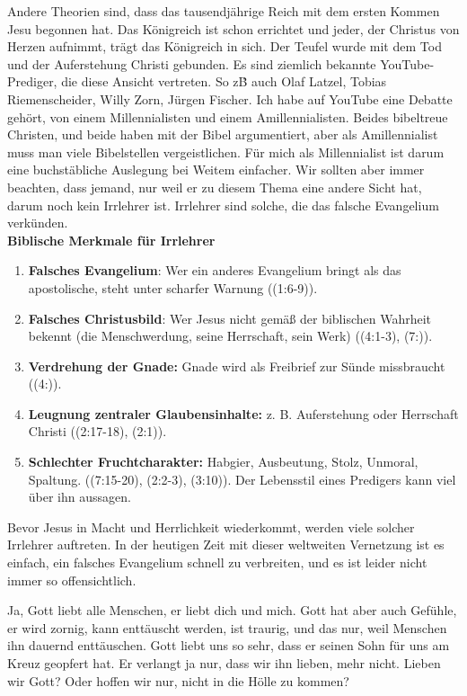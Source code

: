 \begin{otsblock}
        Andere Theorien sind, dass das tausendjährige Reich mit dem ersten Kommen Jesu begonnen hat. Das Königreich ist schon errichtet und jeder, der Christus von Herzen aufnimmt, trägt das Königreich in sich. Der Teufel wurde mit dem Tod und der Auferstehung Christi gebunden. Es sind ziemlich bekannte YouTube-Prediger, die diese Ansicht vertreten. So z\.B auch Olaf Latzel, Tobias Riemenscheider, Willy Zorn, Jürgen Fischer.
        Ich habe auf YouTube eine Debatte gehört, von einem Millennialisten und einem Amillennialisten. Beides bibeltreue Christen, und beide haben mit der Bibel argumentiert, aber als Amillennialist muss man viele Bibelstellen vergeistlichen. Für mich als Millennialist ist darum eine buchstäbliche Auslegung bei Weitem einfacher. Wir sollten aber immer beachten, dass jemand, nur weil er zu diesem Thema eine andere Sicht hat, darum noch kein Irrlehrer ist. Irrlehrer sind solche, die das falsche Evangelium verkünden.\\  
        \textbf{Biblische Merkmale für Irrlehrer}
        \begin{enumerate}
            \item \textbf{Falsches Evangelium}: Wer ein anderes Evangelium bringt als das apostolische, steht unter scharfer Warnung ((1:6-9)).
            \item \textbf{Falsches Christusbild}: Wer Jesus nicht gemäß der biblischen Wahrheit bekennt (die Menschwerdung, seine Herrschaft, sein Werk) ((4:1-3), (7:)).
            \item \textbf{Verdrehung der Gnade:} Gnade wird als Freibrief zur Sünde missbraucht ((4:)).
            \item \textbf{Leugnung zentraler Glaubensinhalte:} z. B. Auferstehung oder Herrschaft Christi ((2:17-18), (2:1)).
            \item \textbf{Schlechter Fruchtcharakter:} Habgier, Ausbeutung, Stolz, Unmoral, Spaltung. 
            ((7:15-20), (2:2-3), (3:10)). Der Lebensstil eines Predigers kann viel über ihn aussagen.
        \end{enumerate}        
        Bevor Jesus in Macht und Herrlichkeit wiederkommt, werden viele solcher Irrlehrer auftreten. In der heutigen Zeit mit dieser weltweiten Vernetzung ist es einfach, ein falsches Evangelium schnell zu verbreiten, und es ist leider nicht immer so offensichtlich.

        Ja, Gott liebt alle Menschen, er liebt dich und mich. Gott hat aber auch Gefühle, er wird zornig, kann enttäuscht werden, ist traurig, und das nur, weil Menschen ihn dauernd enttäuschen. Gott liebt uns so sehr, dass er seinen Sohn für uns am Kreuz geopfert hat.  Er verlangt ja nur, dass wir ihn lieben, mehr nicht. Lieben wir Gott? Oder hoffen wir nur, nicht in die Hölle zu kommen?


\end{otsblock}
